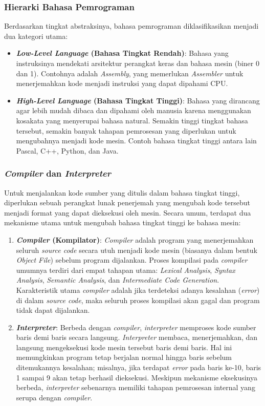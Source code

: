 \documentclass[12pt,a4paper]{article}
\begin{document}
\subsubsection{Hierarki Bahasa Pemrograman}
Berdasarkan tingkat abstraksinya, bahasa pemrograman diklasifikasikan menjadi dua kategori utama:
\begin{itemize}
\item \textbf{\textit{Low-Level Language} (Bahasa Tingkat Rendah)}: Bahasa yang instruksinya mendekati arsitektur perangkat keras dan bahasa mesin (biner 0 dan 1). Contohnya adalah \textit{Assembly}, yang memerlukan \textit{Assembler} untuk menerjemahkan kode menjadi instruksi yang dapat dipahami CPU.
\item \textbf{\textit{High-Level Language} (Bahasa Tingkat Tinggi)}: Bahasa yang dirancang agar lebih mudah dibaca dan dipahami oleh manusia karena menggunakan kosakata yang menyerupai bahasa natural. Semakin tinggi tingkat bahasa tersebut, semakin banyak tahapan pemrosesan yang diperlukan untuk mengubahnya menjadi kode mesin. Contoh bahasa tingkat tinggi antara lain Pascal, C++, Python, dan Java.
\end{itemize}

\subsubsection{\textit{Compiler} dan \textit{Interpreter} }
Untuk menjalankan kode sumber yang ditulis dalam bahasa tingkat tinggi,
diperlukan sebuah perangkat lunak penerjemah yang mengubah kode tersebut menjadi
format yang dapat dieksekusi oleh mesin. Secara umum, terdapat dua mekanisme
utama untuk mengubah bahasa tingkat tinggi ke bahasa mesin:

\begin{enumerate}
\item \textbf{\textit{Compiler} (Kompilator)}:
\textit{Compiler} adalah program yang menerjemahkan seluruh \textit{source code}
secara utuh menjadi kode mesin (biasanya dalam bentuk \textit{Object File})
sebelum program dijalankan. Proses kompilasi pada \textit{compiler} umumnya
terdiri dari empat tahapan utama: \textit{Lexical Analysis}, \textit{Syntax
Analysis}, \textit{Semantic Analysis}, dan \textit{Intermediate Code
Generation}. Karakteristik utama \textit{compiler} adalah jika terdeteksi adanya
kesalahan (\textit{error}) di dalam \textit{source code}, maka seluruh proses
kompilasi akan gagal dan program tidak dapat dijalankan.

\item \textbf{\textit{Interpreter}}: 
Berbeda dengan \textit{compiler}, \textit{interpreter} memproses kode sumber
baris demi baris secara langsung. \textit{Interpreter} membaca,
menerjemahkan, dan langsung mengeksekusi kode mesin tersebut baris demi baris.
Hal ini memungkinkan program tetap berjalan normal hingga baris sebelum
ditemukannya kesalahan; misalnya, jika terdapat \textit{error} pada baris ke-10,
baris 1 sampai 9 akan tetap berhasil dieksekusi. Meskipun mekanisme eksekusinya
berbeda, \textit{interpreter} sebenarnya memiliki tahapan pemrosesan internal
yang serupa dengan \textit{compiler}.

\end{enumerate}
\end{document}
